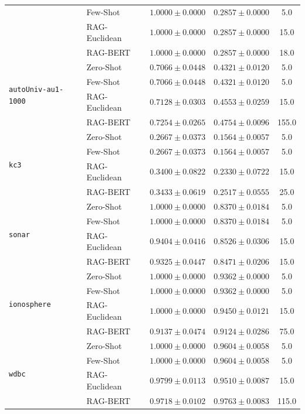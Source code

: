 \documentclass[sn-basic]{sn-jnl}
\begin{document}
\begin{table}[t]
{\begin{tabular}{llccc}
& Few-Shot & $1.0000 \pm 0.0000$ & $0.2857 \pm 0.0000$ & 5.0 \\
& RAG-Euclidean & $1.0000 \pm 0.0000$ & $0.2857 \pm 0.0000$ & 15.0 \\
& RAG-BERT & $1.0000 \pm 0.0000$ & $0.2857 \pm 0.0000$ & 18.0 \\
\midrule
\multirow{4}{*}{\texttt{autoUniv-au1-1000}} & Zero-Shot & $0.7066 \pm 0.0448$ & $0.4321 \pm 0.0120$ & 5.0 \\
& Few-Shot & $0.7066 \pm 0.0448$ & $0.4321 \pm 0.0120$ & 5.0 \\
& RAG-Euclidean & $0.7128 \pm 0.0303$ & $0.4553 \pm 0.0259$ & 15.0 \\
& RAG-BERT & $0.7254 \pm 0.0265$ & $0.4754 \pm 0.0096$ & 155.0 \\
\midrule
\multirow{4}{*}{\texttt{kc3}} & Zero-Shot & $0.2667 \pm 0.0373$ & $0.1564 \pm 0.0057$ & 5.0 \\
& Few-Shot & $0.2667 \pm 0.0373$ & $0.1564 \pm 0.0057$ & 5.0 \\
& RAG-Euclidean & $0.3400 \pm 0.0822$ & $0.2330 \pm 0.0722$ & 15.0 \\
& RAG-BERT & $0.3433 \pm 0.0619$ & $0.2517 \pm 0.0555$ & 25.0 \\
\midrule
\multirow{4}{*}{\texttt{sonar}} & Zero-Shot & $1.0000 \pm 0.0000$ & $0.8370 \pm 0.0184$ & 5.0 \\
& Few-Shot & $1.0000 \pm 0.0000$ & $0.8370 \pm 0.0184$ & 5.0 \\
& RAG-Euclidean & $0.9404 \pm 0.0416$ & $0.8526 \pm 0.0306$ & 15.0 \\
& RAG-BERT & $0.9325 \pm 0.0447$ & $0.8471 \pm 0.0206$ & 15.0 \\
\midrule
\multirow{4}{*}{\texttt{ionosphere}} & Zero-Shot & $1.0000 \pm 0.0000$ & $0.9362 \pm 0.0000$ & 5.0 \\
& Few-Shot & $1.0000 \pm 0.0000$ & $0.9362 \pm 0.0000$ & 5.0 \\
& RAG-Euclidean & $1.0000 \pm 0.0000$ & $0.9450 \pm 0.0121$ & 15.0 \\
& RAG-BERT & $0.9137 \pm 0.0474$ & $0.9124 \pm 0.0286$ & 75.0 \\
\midrule
\multirow{4}{*}{\texttt{wdbc}} & Zero-Shot & $1.0000 \pm 0.0000$ & $0.9604 \pm 0.0058$ & 5.0 \\
& Few-Shot & $1.0000 \pm 0.0000$ & $0.9604 \pm 0.0058$ & 5.0 \\
& RAG-Euclidean & $0.9799 \pm 0.0113$ & $0.9510 \pm 0.0087$ & 15.0 \\
& RAG-BERT & $0.9718 \pm 0.0102$ & $0.9763 \pm 0.0083$ & 115.0 \\
\bottomrule
\end{tabular}
}
\end{table}
\end{document}
